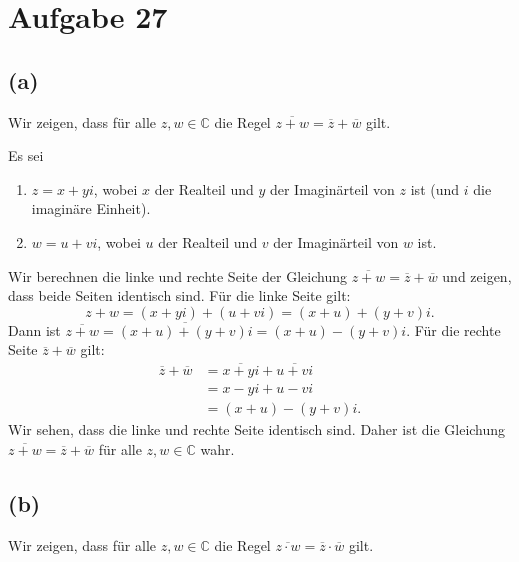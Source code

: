 \documentclass{article}
\theoremstyle{definition}
\theoremstyle{remark}
\begin{document}
\section*{Aufgabe 27}

\subsection*{(a)}
Wir zeigen, dass für alle \( z, w \in \mathbb{C} \) die Regel \( \overline{z + w} = \overline{z} + \overline{w} \) gilt.

\proof Es sei
\begin{enumerate}
    \item	\( z = x + yi \), wobei \( x \) der Realteil und \( y \) der Imaginärteil von \( z \) ist (und \( i \) die imaginäre Einheit).
    \item	\( w = u + vi \), wobei \( u \) der Realteil und \( v \) der Imaginärteil von \( w \) ist.
\end{enumerate}
Wir berechnen die linke und rechte Seite der Gleichung \( \overline{z + w} = \overline{z} + \overline{w} \) und zeigen, dass beide Seiten identisch sind.
Für die linke Seite gilt:
\[ z + w = (x + yi) + (u + vi) = (x + u) + (y + v)i. \]
Dann ist \( \overline{z + w} = \overline{(x + u) + (y + v)i} = (x + u) - (y + v)i \). Für die rechte Seite \( \overline{z} + \overline{w} \) gilt:
\begin{align*}
    \overline{z} + \overline{w} & = \overline{x + yi} + \overline{u + vi} \\
                                & = x - yi + u - vi                       \\
                                & = (x + u) - (y + v)i.
\end{align*}
Wir sehen, dass die linke und rechte Seite identisch sind. Daher ist die Gleichung \( \overline{z + w} = \overline{z} + \overline{w} \) für alle \( z, w \in \mathbb{C} \) wahr.
\endproof

\subsection*{(b)}
Wir zeigen, dass für alle \( z, w \in \mathbb{C} \) die Regel \( \overline{z \cdot w} = \overline{z} \cdot \overline{w} \) gilt.
\end{document}
